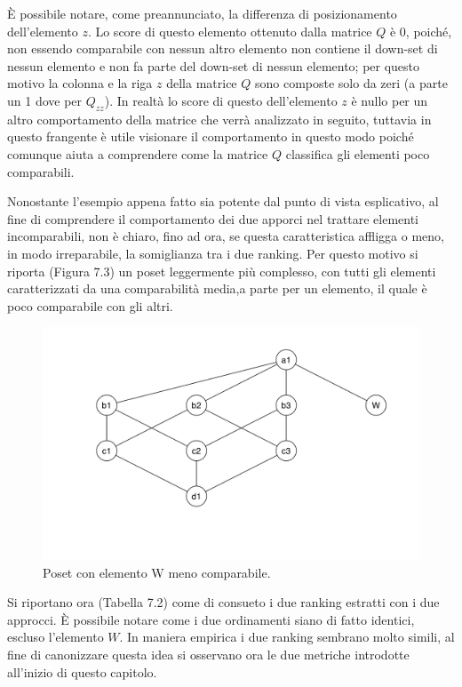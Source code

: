 \documentclass{report}
\begin{document}
È possibile notare, come preannunciato, la differenza di posizionamento dell'elemento $z$. Lo score di questo elemento ottenuto dalla matrice $Q$ è 0, poiché, non essendo comparabile con nessun altro elemento non contiene il down-set di nessun elemento e non fa parte del down-set di nessun elemento; per questo motivo la colonna e la riga $z$ della matrice $Q$ sono composte solo da zeri (a parte un 1 dove per $Q_{zz}$). In realtà lo score di questo dell'elemento $z$ è nullo per un altro comportamento della matrice che verrà analizzato in seguito, tuttavia in questo frangente è utile visionare il comportamento in questo modo poiché comunque aiuta a comprendere come la matrice $Q$ classifica gli elementi poco comparabili.


Nonostante l'esempio appena fatto sia potente dal punto di vista esplicativo, al fine di comprendere il comportamento dei due apporci nel trattare elementi incomparabili, non è chiaro, fino ad ora, se questa caratteristica affligga o meno, in modo irreparabile, la somiglianza tra i due ranking. Per questo motivo si riporta (Figura 7.3) un poset leggermente più complesso, con tutti gli elementi caratterizzati da una comparabilità media,a parte per un elemento, il quale è poco comparabile con gli altri.

\begin{figure}[H]
    \centering
    \includegraphics[width=12cm]{IMAGES/poset_2.png}
    \caption{Poset con elemento W meno comparabile.}
    \label{fig:roc}
\end{figure}

Si riportano ora (Tabella 7.2) come di consueto i due ranking estratti con i due approcci. È possibile notare come i due ordinamenti siano di fatto identici, escluso l'elemento $W$. In maniera empirica i due ranking sembrano molto simili, al fine di canonizzare questa idea si osservano ora le due metriche introdotte all'inizio di questo capitolo.
\end{document}
